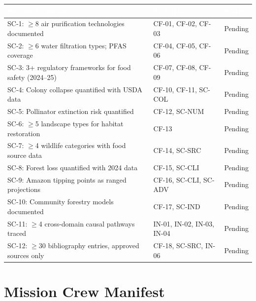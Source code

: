\documentclass[11pt,letterpaper]{article}
\newcommand{\tableheader}[1]{\textbf{\sffamily\textcolor{white}{#1}}}
\begin{document}
\begin{center}
\begin{tabularx}{\textwidth}{XL{4cm}C{1.5cm}}
\toprule
{}
\tableheader{Success Criterion} & \tableheader{Test ID(s)} & \tableheader{Status} \\
\midrule
SC-1: $\geq$8 air purification technologies documented & CF-01, CF-02, CF-03 & Pending \\
SC-2: $\geq$6 water filtration types; PFAS coverage & CF-04, CF-05, CF-06 & Pending \\
SC-3: 3+ regulatory frameworks for food safety (2024--25) & CF-07, CF-08, CF-09 & Pending \\
SC-4: Colony collapse quantified with USDA data & CF-10, CF-11, SC-COL & Pending \\
SC-5: Pollinator extinction risk quantified & CF-12, SC-NUM & Pending \\
SC-6: $\geq$5 landscape types for habitat restoration & CF-13 & Pending \\
SC-7: $\geq$4 wildlife categories with food source data & CF-14, SC-SRC & Pending \\
SC-8: Forest loss quantified with 2024 data & CF-15, SC-CLI & Pending \\
SC-9: Amazon tipping points as ranged projections & CF-16, SC-CLI, SC-ADV & Pending \\
SC-10: Community forestry models documented & CF-17, SC-IND & Pending \\
SC-11: $\geq$4 cross-domain causal pathways traced & IN-01, IN-02, IN-03, IN-04 & Pending \\
SC-12: $\geq$30 bibliography entries, approved sources only & CF-18, SC-SRC, IN-06 & Pending \\
\bottomrule
\end{tabularx}
\end{center}

\section{Mission Crew Manifest}
\end{document}
